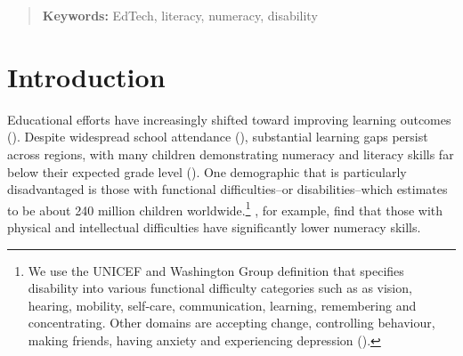 \documentclass[hidelinks,12pt]{article}
\begin{document}
\begin{singlespace}
\begin{titlepage}
\begin{abstract}
\textbf{Keywords:} EdTech, literacy, numeracy, disability \\

\bigskip
\end{abstract}
\setcounter{page}{0}
\thispagestyle{empty}
\end{titlepage}
\pagebreak \newpage

\onehalfspacing

\section{Introduction} \label{sec:introduction} %
Educational efforts have increasingly shifted toward improving learning outcomes (\cite{glewwe_schools_2017}). Despite widespread school attendance (\cite{world_bank_world_2018, glewwe_chapter_2006}), substantial learning gaps persist across regions, with many children demonstrating numeracy and literacy skills far below their expected grade level (\cite{world_bank_world_2018}). One demographic that is particularly disadvantaged is those with functional difficulties–or disabilities–which \textcite{unicef_seen_2021} estimates to be about 240 million children worldwide.\footnote{We use the UNICEF and Washington Group definition that specifies disability into various functional difficulty categories such as as vision, hearing, mobility, self-care, communication, learning, remembering and concentrating. Other domains are accepting change, controlling behaviour, making friends, having anxiety and experiencing depression (\cite{unicef_seen_2021}).} \textcite{zhang_numeracy_2023}, for example, find that those with physical and intellectual difficulties have significantly lower numeracy skills. 


\end{singlespace}
\end{document}
